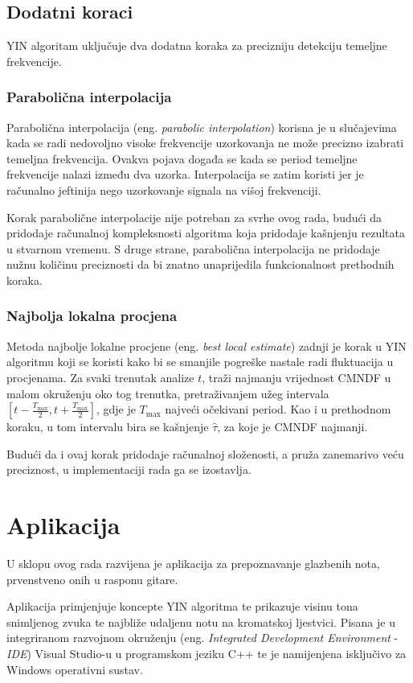 \documentclass[times, utf8, diplomski, numeric]{fer}
\begin{document}
\section{Dodatni koraci}
%
YIN algoritam uključuje dva dodatna koraka za precizniju detekciju temeljne frekvencije.

\subsection{Parabolična interpolacija}
%
Parabolična interpolacija (eng. \textit{parabolic interpolation}) korisna je u slučajevima kada se radi nedovoljno visoke frekvencije uzorkovanja ne može precizno izabrati temeljna frekvencija. Ovakva pojava događa se kada se period temeljne frekvencije nalazi između dva uzorka. Interpolacija se zatim koristi jer je računalno jeftinija nego uzorkovanje signala na višoj frekvenciji. 

Korak parabolične interpolacije nije potreban za svrhe ovog rada, budući da pridodaje računalnoj kompleksnosti algoritma koja pridodaje kašnjenju rezultata u stvarnom vremenu. S druge strane, parabolična interpolacija ne pridodaje nužnu količinu preciznosti da bi znatno unaprijedila funkcionalnost prethodnih koraka.

\subsection{Najbolja lokalna procjena}
%
Metoda najbolje lokalne procjene (eng. \textit{best local estimate}) zadnji je korak u YIN algoritmu koji se koristi kako bi se smanjile pogreške nastale radi fluktuacija u procjenama. Za svaki trenutak analize $t$, traži najmanju vrijednost CMNDF u malom okruženju oko tog trenutka, pretraživanjem užeg intervala $[t - \frac{T_{\text{max}}}{2}, t + \frac{T_{\text{max}}}{2}]$, gdje je $T_{\text{max}}$ najveći očekivani period. Kao i u prethodnom koraku, u tom intervalu bira se kašnjenje $\hat{\tau}$, za koje je CMNDF najmanji.

Budući da i ovaj korak pridodaje računalnoj složenosti, a pruža zanemarivo veću preciznost, u implementaciji rada ga se izostavlja.

\chapter{Aplikacija}
%
U sklopu ovog rada razvijena je aplikacija za prepoznavanje glazbenih nota, prvenstveno onih u rasponu gitare.

Aplikacija primjenjuje koncepte YIN algoritma te prikazuje visinu tona snimljenog zvuka te najbliže udaljenu notu na kromatskoj ljestvici. Pisana je u integriranom razvojnom okruženju (eng. \textit{Integrated Development Environment} - \textit{IDE}) Visual Studio-u u programskom jeziku C++ te je namijenjena isključivo za Windows operativni sustav.
\end{document}
